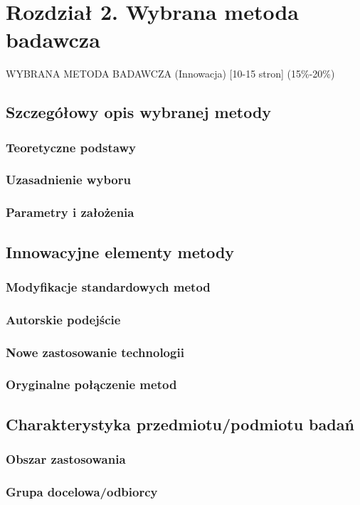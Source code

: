 \section{Rozdział 2. Wybrana metoda badawcza}
WYBRANA METODA BADAWCZA (Innowacja) [10-15 stron] (15\%-20\%)
\subsection{Szczegółowy opis wybranej metody}
\subsubsection*{Teoretyczne podstawy}
\subsubsection*{Uzasadnienie wyboru}
\subsubsection*{Parametry i założenia}


\subsection{Innowacyjne elementy metody}
\subsubsection*{Modyfikacje standardowych metod}
\subsubsection*{Autorskie podejście}
\subsubsection*{Nowe zastosowanie technologii}
\subsubsection*{Oryginalne połączenie metod}

\subsection{Charakterystyka przedmiotu/podmiotu badań}
\subsubsection*{Obszar zastosowania}
\subsubsection*{Grupa docelowa/odbiorcy}

